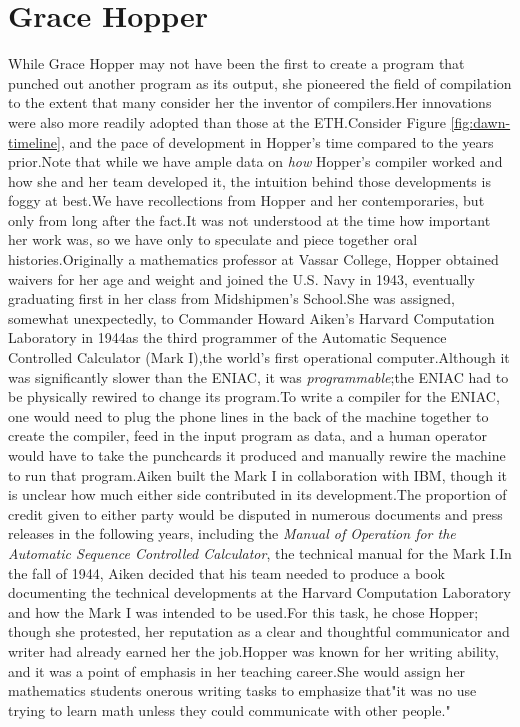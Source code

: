 \section{Grace Hopper}
While Grace Hopper may not have been the first
to create a program that punched
out another program as its output, she pioneered the field of compilation to the
extent that many consider her the inventor of compilers.Her innovations were
also more readily adopted than those at the ETH.Consider Figure
\ref{fig:dawn-timeline}, and the pace of development in Hopper's time compared
to the years prior.Note that while we have ample data on \textit{how} Hopper's
compiler worked and how she and her team developed it, the intuition behind
those developments is foggy at best.We have recollections from Hopper and her
contemporaries, but only from long after the fact.It was not understood at the
time how important her work was, so we have only to speculate and piece together
oral histories.Originally a mathematics professor at Vassar College, Hopper
obtained waivers for her age and weight and joined the U.S. Navy in 1943,
eventually graduating first in her class from Midshipmen's School.She was
assigned, somewhat unexpectedly, to Commander Howard Aiken's Harvard
Computation Laboratory in 1944as the third programmer of the Automatic Sequence
Controlled Calculator (Mark I),the world's first operational computer.Although
it was significantly slower than the ENIAC, it was \textit{programmable};the
ENIAC had to be physically rewired to change its program.To write a compiler
for the ENIAC, one would need to plug the phone lines in the back of the
machine together to create the compiler, feed in the input program as data, and
a human operator would have to take the punchcards it produced and manually
rewire the machine to run that program.Aiken built the Mark I in collaboration
with IBM, though it is unclear how much either side contributed in its
development.The proportion of credit given to either party would be disputed in
numerous documents and press releases in the following years, including
the \textit{Manual of Operation for the Automatic Sequence Controlled
Calculator}, the technical manual for the Mark I.In the fall of 1944, Aiken
decided that his team needed to produce a book documenting the
technical developments at the Harvard Computation Laboratory and how the Mark I
was intended to be used.For this task, he chose Hopper; though she protested,
her reputation as a clear and thoughtful communicator and writer had already
earned her the job.Hopper was known for her writing ability, and it was a point
of emphasis in her teaching career.She would assign her mathematics students
onerous writing tasks to emphasize that"it was no use trying to learn math
unless they could communicate with other people."
\cite[interview on 5 July, 1972]{grace_hopper_and_the_invention_of_the_information_age_2009}

